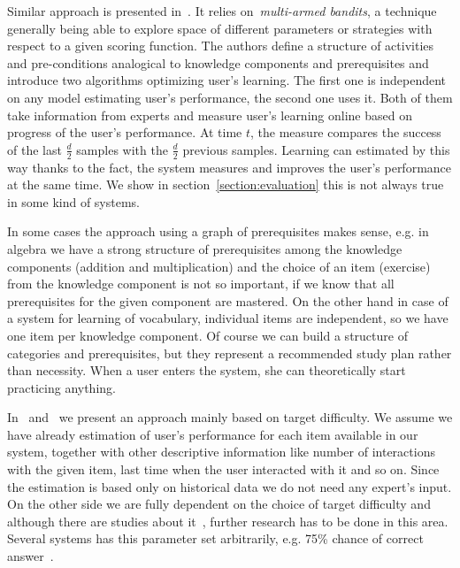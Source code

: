 \documentclass[table,color,cover,twoside,nolot,nolof]{fithesis3/fithesis3}
\begin{document}
Similar approach is presented in~\cite{lopes2015multi}. It relies
on~\emph{multi-armed bandits}, a technique generally being able to explore
space of different parameters or strategies with respect to a given scoring
function. The authors define a structure of activities and pre-conditions
analogical to knowledge components and prerequisites and introduce two
algorithms optimizing user's learning. The first one is independent on any
model estimating user's performance, the second one uses it. Both of them take
information from experts and measure user's learning online based on progress
of the user's performance. At time $t$, the measure compares the success of the
last $\frac{d}{2}$ samples with the $\frac{d}{2}$ previous samples. Learning
can estimated by this way thanks to the fact, the system measures and improves
the user's performance at the same time. We show in
section~\ref{section:evaluation} this is not always true in some kind of
systems.

In some cases the approach using a graph of prerequisites makes sense, e.g.
in algebra we have a strong structure of prerequisites among the knowledge
components (addition and multiplication) and the choice of an item (exercise)
from the knowledge component is not so important, if we know that all
prerequisites for the given component are mastered. On the other hand in case
of a system for learning of vocabulary, individual items are independent, so we
have one item per knowledge component. Of course we can build a structure of
categories and prerequisites, but they represent a recommended study plan
rather than necessity. When a user enters the system, she can theoretically
start practicing anything.

In~\cite{papousek2014adaptive} and~\cite{papousek2015impact} we present an
approach mainly based on target difficulty. We assume we have already
estimation of user's performance for each item available in our system,
together with other descriptive information like number of interactions with
the given item, last time when the user interacted with it and so on. Since the
estimation is based only on historical data we do not need any expert's input.
On the other side we are fully dependent on the choice of target difficulty and
although there are studies about it~\cite{lomas2013optimizing,
lomas2014optimizing,jansen2013influence,papousek2015impact}, further research
has to be done in this area. Several systems has this parameter set
arbitrarily, e.g.  75\% chance of correct
answer~\cite{klinkenberg2011computer}.
\end{document}
